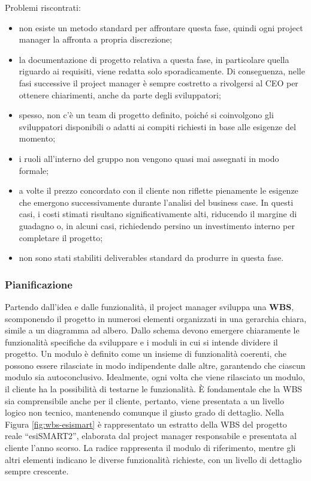         Problemi riscontrati:
        \begin{itemize}
            \item non esiste un metodo standard per affrontare questa fase, quindi ogni project manager la affronta a propria discrezione;
            \item la documentazione di progetto relativa a questa fase, in particolare quella riguardo ai requisiti, viene redatta solo sporadicamente.
            Di conseguenza, nelle fasi successive il project manager è sempre costretto a rivolgersi al CEO per ottenere chiarimenti, anche da parte degli sviluppatori;
            \item spesso, non c’è un team di progetto definito, poiché si coinvolgono gli sviluppatori disponibili o adatti ai compiti richiesti in base alle esigenze del momento;
            \item i ruoli all'interno del gruppo non vengono quasi mai assegnati in modo formale;
            \item a volte il prezzo concordato con il cliente non riflette pienamente le esigenze che emergono successivamente durante l'analisi del business case.
            In questi casi, i costi stimati risultano significativamente alti, riducendo il margine di guadagno o, in alcuni casi, richiedendo persino un
            investimento interno per completare il progetto;
            \item non sono stati stabiliti deliverables standard da produrre in questa fase.
        \end{itemize}

        \subsubsection{Pianificazione}
        Partendo dall’idea e dalle funzionalità, il project manager sviluppa una \textbf{\ac{WBS}}, scomponendo il progetto in
        numerosi elementi organizzati in una gerarchia chiara, simile a un diagramma ad albero. Dallo schema devono emergere chiaramente le
        funzionalità specifiche da sviluppare e i moduli in cui si intende dividere il progetto. Un modulo è definito come un insieme di funzionalità
        coerenti, che possono essere rilasciate in modo indipendente dalle altre, garantendo che ciascun modulo sia autoconclusivo. Idealmente, ogni
        volta che viene rilasciato un modulo, il cliente ha la possibilità di testarne le funzionalità. È fondamentale che la \ac{WBS} sia comprensibile
        anche per il cliente, pertanto, viene presentata a un livello logico non tecnico, mantenendo comunque il giusto grado di dettaglio.
        Nella Figura \ref{fig:wbs-esismart} è rappresentato un estratto della \ac{WBS} del progetto reale “esiSMART2”, elaborata dal project manager responsabile e
        presentata al cliente l'anno scorso. La radice rappresenta il modulo di riferimento, mentre gli altri elementi indicano le diverse
        funzionalità richieste, con un livello di dettaglio sempre crescente.

